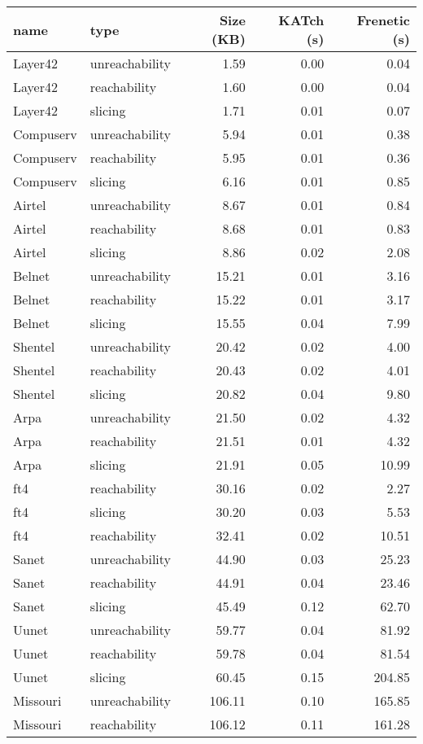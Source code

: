 \begin{tabular}{llrrr}
\toprule
name & type & Size (KB) & KATch (s) & Frenetic (s) \\
\midrule
Layer42 & unreachability & 1.59 & 0.00 & 0.04 \\
Layer42 & reachability & 1.60 & 0.00 & 0.04 \\
Layer42 & slicing & 1.71 & 0.01 & 0.07 \\
Compuserv & unreachability & 5.94 & 0.01 & 0.38 \\
Compuserv & reachability & 5.95 & 0.01 & 0.36 \\
Compuserv & slicing & 6.16 & 0.01 & 0.85 \\
Airtel & unreachability & 8.67 & 0.01 & 0.84 \\
Airtel & reachability & 8.68 & 0.01 & 0.83 \\
Airtel & slicing & 8.86 & 0.02 & 2.08 \\
Belnet & unreachability & 15.21 & 0.01 & 3.16 \\
Belnet & reachability & 15.22 & 0.01 & 3.17 \\
Belnet & slicing & 15.55 & 0.04 & 7.99 \\
Shentel & unreachability & 20.42 & 0.02 & 4.00 \\
Shentel & reachability & 20.43 & 0.02 & 4.01 \\
Shentel & slicing & 20.82 & 0.04 & 9.80 \\
Arpa & unreachability & 21.50 & 0.02 & 4.32 \\
Arpa & reachability & 21.51 & 0.01 & 4.32 \\
Arpa & slicing & 21.91 & 0.05 & 10.99 \\
ft4 & reachability & 30.16 & 0.02 & 2.27 \\
ft4 & slicing & 30.20 & 0.03 & 5.53 \\
ft4 & reachability & 32.41 & 0.02 & 10.51 \\
Sanet & unreachability & 44.90 & 0.03 & 25.23 \\
Sanet & reachability & 44.91 & 0.04 & 23.46 \\
Sanet & slicing & 45.49 & 0.12 & 62.70 \\
Uunet & unreachability & 59.77 & 0.04 & 81.92 \\
Uunet & reachability & 59.78 & 0.04 & 81.54 \\
Uunet & slicing & 60.45 & 0.15 & 204.85 \\
Missouri & unreachability & 106.11 & 0.10 & 165.85 \\
Missouri & reachability & 106.12 & 0.11 & 161.28 \\

\end{tabular}
